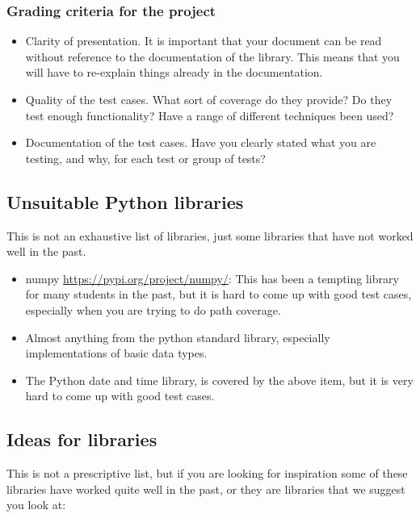 \documentclass[a4paper]{article}
\begin{document}
\subsubsection*{Grading criteria for the project}
\begin{itemize}
\item Clarity of presentation. It is important that your document can
  be read without reference to the documentation of the library. This
  means that you will have to re-explain things already in the
  documentation. 
\item Quality of the test cases. What sort of coverage do they
  provide? Do they test enough functionality? Have a range of different 
  techniques been used?
\item Documentation of the test cases. Have you clearly stated what you are
  testing, and why, for each test or group of tests? 

 
\end{itemize}

\subsection*{Unsuitable Python libraries}
This is not an exhaustive list of libraries, just some libraries that
have not worked well in the past.
\begin{itemize}
\item numpy \url{https://pypi.org/project/numpy/}: This has been a
  tempting library for many students in the past, but it is hard to
  come up with good test cases, especially when you are trying to do
  path coverage.
\item Almost anything from the python standard library, especially
  implementations of basic data types.
\item The Python date and time library, is covered by the above item,
  but it is very hard to come up with good test cases.
  
\end{itemize}



\subsection*{Ideas for libraries}
This is not a prescriptive list, but if you are looking for
inspiration some of these libraries have worked quite well in the
past, or they are libraries that we suggest you look at:
\end{document}

